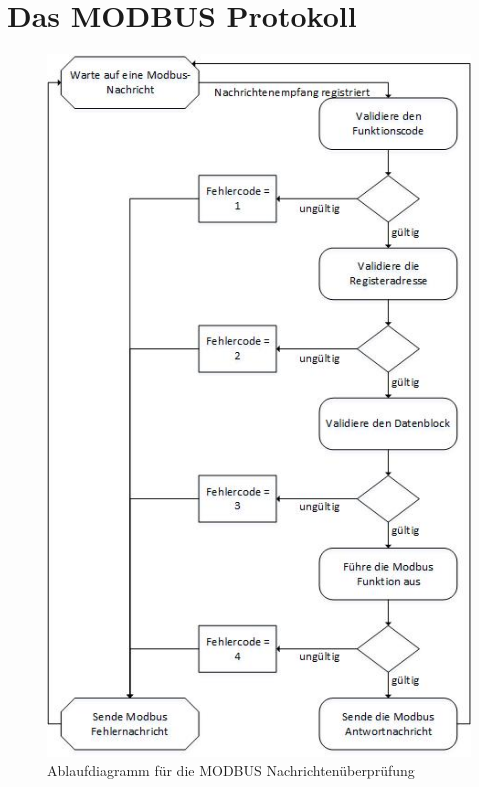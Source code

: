 \chapter{Das MODBUS Protokoll}
\begin{figure}[h]
\centering
\includegraphics[scale=0.65]{modbus/modbustransdiag}
\caption{Ablaufdiagramm für die MODBUS Nachrichtenüberprüfung \cite[S. 9]{ModbusDoc}}
\label{fig:modbustransdiag}
\end{figure}
\newpage
